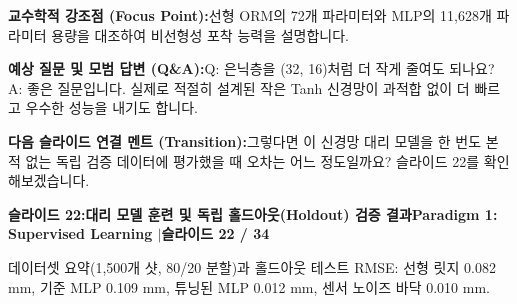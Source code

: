 \documentclass[11pt,a4paper]{article}
\begin{document}
\vspace{0.2em}
\begin{tcolorbox}[colback=lightbg,colframe=bordergray,left=6pt,right=6pt,top=3pt,bottom=3pt,boxrule=0.6pt,arc=2.5pt]
\small
\noindent\textbf{\color{navy}교수학적 강조점 (Focus Point):}\enspace 선형 ORM의 72개 파라미터와 MLP의 11,628개 파라미터 용량을 대조하여 비선형성 포착 능력을 설명합니다.\par\vspace{0.3em}
\noindent\textbf{\color{successgreen}예상 질문 및 모범 답변 (Q\&A):}\enspace Q: 은닉층을 (32, 16)처럼 더 작게 줄여도 되나요? A: 좋은 질문입니다. 실제로 적절히 설계된 작은 Tanh 신경망이 과적합 없이 더 빠르고 우수한 성능을 내기도 합니다.\par\vspace{0.3em}
\noindent\textbf{\color{accent}다음 슬라이드 연결 멘트 (Transition):}\enspace 그렇다면 이 신경망 대리 모델을 한 번도 본 적 없는 독립 검증 데이터에 평가했을 때 오차는 어느 정도일까요? 슬라이드 22를 확인해보겠습니다.
\end{tcolorbox}
\clearpage
\hypertarget{slide.22}{}
{}
\noindent\begin{tcolorbox}[colback=navy,colframe=navy,left=6pt,right=6pt,top=3pt,bottom=3pt,boxrule=0pt,arc=2pt]
{\large\bfseries\color{white}슬라이드 22:\enspace 대리 모델 훈련 및 독립 홀드아웃(Holdout) 검증 결과}\hfill{\footnotesize\bfseries\color{white!85!lightbg}Paradigm 1: Supervised Learning \enspace$|$\enspace 슬라이드 22 / 34}
\end{tcolorbox}
\vspace{0.2em}
\begin{tcolorbox}[colback=lightbg,colframe=bordergray,title={\footnotesize\bfseries\color{darkgray}슬라이드 시각 구성 요약},fontupper=\small,left=6pt,right=6pt,top=2.5pt,bottom=2.5pt,boxrule=0.6pt,arc=2.5pt]
데이터셋 요약(1,500개 샷, 80/20 분할)과 홀드아웃 테스트 RMSE: 선형 릿지 0.082 mm, 기준 MLP 0.109 mm, 튜닝된 MLP 0.012 mm, 센서 노이즈 바닥 0.010 mm.
\end{tcolorbox}
\vspace{0.2em}
\end{document}
